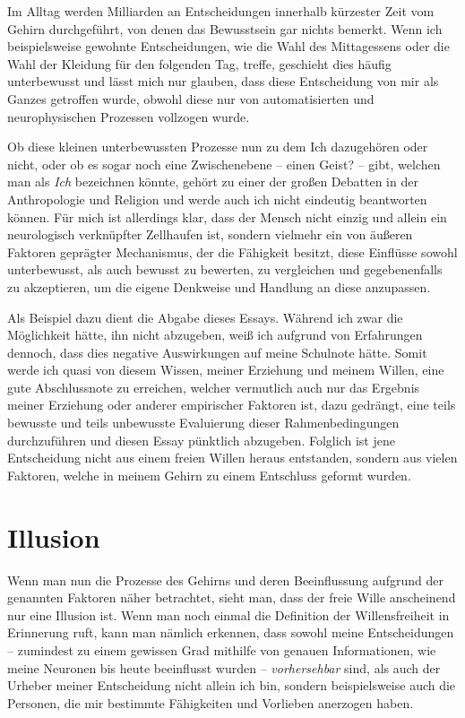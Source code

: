 \documentclass[a4paper, 12pt]{article}
\begin{document}
Im Alltag werden Milliarden an Entscheidungen innerhalb kürzester Zeit vom Gehirn durchgeführt, von denen das Bewusstsein gar nichts bemerkt. Wenn ich beispielsweise gewohnte Entscheidungen, wie die Wahl des Mittagessens oder die Wahl der Kleidung für den folgenden Tag, treffe, geschieht dies häufig unterbewusst und lässt mich nur glauben, dass diese Entscheidung von mir als Ganzes getroffen wurde, obwohl diese nur von automatisierten und neurophysischen Prozessen vollzogen wurde.

Ob diese kleinen unterbewussten Prozesse nun zu dem Ich dazugehören oder nicht, oder ob es sogar noch eine Zwischenebene -- einen Geist? -- gibt, welchen man als \textit{Ich} bezeichnen könnte, gehört zu einer der großen Debatten in der Anthropologie und Religion und werde auch ich nicht eindeutig beantworten können. Für mich ist allerdings klar, dass der Mensch nicht einzig und allein ein neurologisch verknüpfter Zellhaufen ist, sondern vielmehr ein von äußeren Faktoren geprägter Mechanismus, der die Fähigkeit besitzt, diese Einflüsse sowohl unterbewusst, als auch bewusst zu bewerten, zu vergleichen und gegebenenfalls zu akzeptieren, um die eigene Denkweise und Handlung an diese anzupassen.

Als Beispiel dazu dient die Abgabe dieses Essays. Während ich zwar die Möglichkeit hätte, ihn nicht abzugeben, weiß ich aufgrund von Erfahrungen dennoch, dass dies negative Auswirkungen auf meine Schulnote hätte. Somit werde ich quasi von diesem Wissen, meiner Erziehung und meinem Willen, eine gute Abschlussnote zu erreichen, welcher vermutlich auch nur das Ergebnis meiner Erziehung oder anderer empirischer Faktoren ist, dazu gedrängt, eine teils bewusste und teils unbewusste Evaluierung dieser Rahmenbedingungen durchzuführen und diesen Essay pünktlich abzugeben. Folglich ist jene Entscheidung nicht aus einem freien Willen heraus entstanden, sondern aus vielen Faktoren, welche in meinem Gehirn zu einem Entschluss geformt wurden.

\section{Illusion}
Wenn man nun die Prozesse des Gehirns und deren Beeinflussung aufgrund der genannten Faktoren näher betrachtet, sieht man, dass der freie Wille anscheinend nur eine Illusion ist. Wenn man noch einmal die Definition der Willensfreiheit in Erinnerung ruft, kann man nämlich erkennen, dass sowohl meine Entscheidungen -- zumindest zu einem gewissen Grad mithilfe von genauen Informationen, wie meine Neuronen bis heute beeinflusst wurden -- \textit{vorhersehbar} sind, als auch der Urheber meiner Entscheidung nicht allein ich bin, sondern beispielsweise auch die Personen, die mir bestimmte Fähigkeiten und Vorlieben anerzogen haben.
\end{document}
